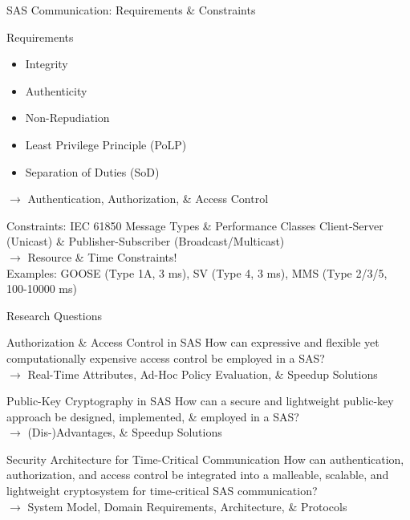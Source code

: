 \documentclass[en]{sdqbeamer}
\begin{document}
\begin{frame}{SAS Communication: Requirements \& Constraints}
    \begin{blueblock}{Requirements}
        \begin{itemize}
            \item Integrity
            \item Authenticity
            \item Non-Repudiation
            \item Least Privilege Principle (PoLP)
            \item Separation of Duties (SoD)
        \end{itemize}
        $\rightarrow$ Authentication, Authorization, \& Access Control
    \end{blueblock}
    \begin{grayblock}{Constraints: IEC 61850 Message Types \& Performance Classes \parencite*{IEC61850P5,IEC61850P8}}
        Client-Server (Unicast) \& Publisher-Subscriber (Broadcast/Multicast) \\$\rightarrow$ Resource \& Time Constraints!
        \\Examples: GOOSE (Type 1A, 3 ms), SV (Type 4, 3 ms), MMS (Type 2/3/5, 100-10000 ms)
    \end{grayblock}
\end{frame}
\begin{frame}{Research Questions}
    \begin{greenblock}{Authorization \& Access Control in SAS}
        How can expressive and flexible yet computationally expensive access control be employed in a SAS?
        \\$\rightarrow$ Real-Time Attributes, Ad-Hoc Policy Evaluation, \& Speedup Solutions
    \end{greenblock}

    \begin{greenblock}{Public-Key Cryptography in SAS}
        How can a secure and lightweight public-key approach be designed, implemented, \& employed in a SAS?
        \\$\rightarrow$ (Dis-)Advantages, \& Speedup Solutions
    \end{greenblock}

    \begin{greenblock}{Security Architecture for Time-Critical Communication}
        How can authentication, authorization, and access control be integrated into a malleable, scalable, and lightweight cryptosystem for time-critical SAS communication?
        \\$\rightarrow$ System Model, Domain Requirements, Architecture, \& Protocols
    \end{greenblock}
\end{frame}
\end{document}
